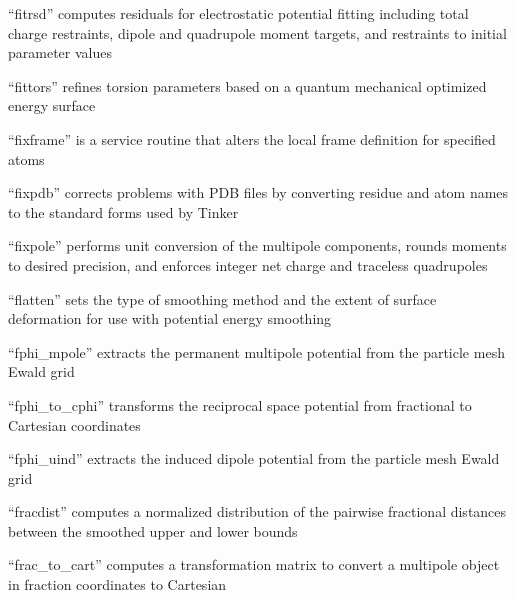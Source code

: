 \documentclass[letterpaper,11pt,english]{sphinxmanual}
\begin{document}

“fitrsd” computes residuals for electrostatic potential fitting
including total charge restraints, dipole and quadrupole moment
targets, and restraints to initial parameter values


“fittors” refines torsion parameters based on a quantum
mechanical optimized energy surface


“fixframe” is a service routine that alters the local frame
definition for specified atoms


“fixpdb” corrects problems with PDB files by converting residue
and atom names to the standard forms used by Tinker


“fixpole” performs unit conversion of the multipole components,
rounds moments to desired precision, and enforces integer net
charge and traceless quadrupoles


“flatten” sets the type of smoothing method and the extent of
surface deformation for use with potential energy smoothing


“fphi\_mpole” extracts the permanent multipole potential from
the particle mesh Ewald grid


“fphi\_to\_cphi” transforms the reciprocal space potential from
fractional to Cartesian coordinates


“fphi\_uind” extracts the induced dipole potential from
the particle mesh Ewald grid


“fracdist” computes a normalized distribution of the pairwise
fractional distances between the smoothed upper and lower bounds


“frac\_to\_cart” computes a transformation matrix to convert
a multipole object in fraction coordinates to Cartesian
\end{document}
